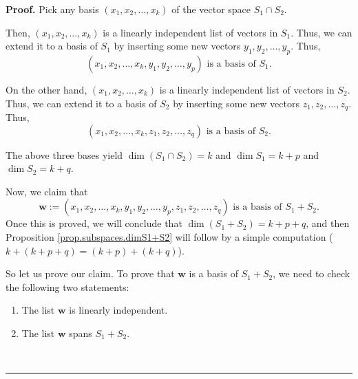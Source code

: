 \documentclass[numbers=enddot,12pt,final,onecolumn,notitlepage]{scrartcl}%
\numberwithin{exer}{subsection}
\theoremstyle{definition}
\newenvironment{proof}[1][Proof]{\noindent\textbf{#1.} }{\ \rule{0.5em}{0.5em}}
\begin{document}
\begin{proof}
Pick any basis $\left(  x_{1},x_{2},\ldots,x_{k}\right)  $ of the vector space
$S_{1}\cap S_{2}$.

Then, $\left(  x_{1},x_{2},\ldots,x_{k}\right)  $ is a linearly independent
list of vectors in $S_{1}$. Thus, we can extend it to a basis of $S_{1}$ by
inserting some new vectors $y_{1},y_{2},\ldots,y_{p}$. Thus,%
\[
\left(  x_{1},x_{2},\ldots,x_{k},y_{1},y_{2},\ldots,y_{p}\right)  \text{ is a
basis of }S_{1}\text{.}%
\]


On the other hand, $\left(  x_{1},x_{2},\ldots,x_{k}\right)  $ is a linearly
independent list of vectors in $S_{2}$. Thus, we can extend it to a basis of
$S_{2}$ by inserting some new vectors $z_{1},z_{2},\ldots,z_{q}$. Thus,%
\[
\left(  x_{1},x_{2},\ldots,x_{k},z_{1},z_{2},\ldots,z_{q}\right)  \text{ is a
basis of }S_{2}\text{.}%
\]


The above three bases yield $\dim\left(  S_{1}\cap S_{2}\right)  =k$ and $\dim
S_{1}=k+p$ and $\dim S_{2}=k+q$.

Now, we claim that
\[
\mathbf{w}:=\left(  x_{1},x_{2},\ldots,x_{k},y_{1},y_{2},\ldots,y_{p}%
,z_{1},z_{2},\ldots,z_{q}\right)  \text{ is a basis of }S_{1}+S_{2}.
\]
Once this is proved, we will conclude that $\dim\left(  S_{1}+S_{2}\right)
=k+p+q$, and then Proposition \ref{prop.subspaces.dimS1+S2} will follow by a
simple computation ($k+\left(  k+p+q\right)  =\left(  k+p\right)  +\left(
k+q\right)  $).

So let us prove our claim. To prove that $\mathbf{w}$ is a basis of
$S_{1}+S_{2}$, we need to check the following two statements:

\begin{enumerate}
\item The list $\mathbf{w}$ is linearly independent.

\item The list $\mathbf{w}$ spans $S_{1}+S_{2}$.
\end{enumerate}


\end{proof}
\end{document}

